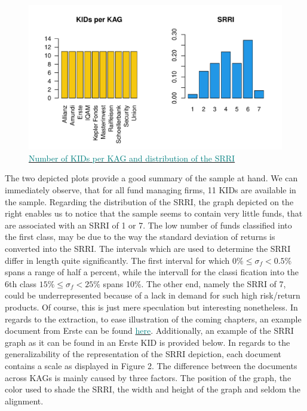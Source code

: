 \documentclass[aodsor,preprint]{imsart}
\numberwithin{equation}{section}
\theoremstyle{plain}
\begin{document}
\begin{figure}[H]
	\includegraphics[width = 12cm]{data_overview.pdf}
	\caption{\href{https://github.com/Base-R-Best-R/KID/blob/main/Code/Tests/Test_ext_Function.pdf}{\textcolor{teal}{Number of KIDs per KAG and distribution of the SRRI}}}
\end{figure}

The two depicted plots provide a good summary of the sample at hand. We can immediately observe, that for all fund managing firms, 11 KIDs are available in the sample. Regarding the distribution of the SRRI, the graph depicted on the right enables us to notice that the sample seems to contain very little funds, that are associated with an SRRI of 1 or 7. The low number of funds classified into the first class, may be due to the way the standard deviation of returns is converted into the SRRI. The intervals which are used to determine the SRRI differ in length quite significantly. The first interval for which $0\% \leq\sigma_f<0.5\%$ spans a range of half a percent, while the intervall for the classi fication into the 6th class $15\%\leq\sigma_f<25\%$ spans 10\%. The other end, namely the SRRI of 7, could be underrepresented because of a lack in demand for such high risk/return products. Of course, this is just mere speculation but interesting nonetheless.
In regards to the extraction, to ease illustration of the coming chapters, an example document from Erste can be found \href{https://github.com/Base-R-Best-R/KID/blob/main/KIDs/Erste/kid-eb-147-t2957-at_de-de_en_4.pdf}{\textcolor{teal}{here}}. Additionally, an example of the SRRI graph as it can be found in an Erste KID is provided below. In regards to the generalizability of the representation of the SRRI depiction, each document contains a scale as displayed in Figure 2. The difference between the documents across KAGs is mainly caused by three factors. The position of the graph, the color used to shade the SRRI, the width and height of the graph and seldom the alignment. 
\end{document}
